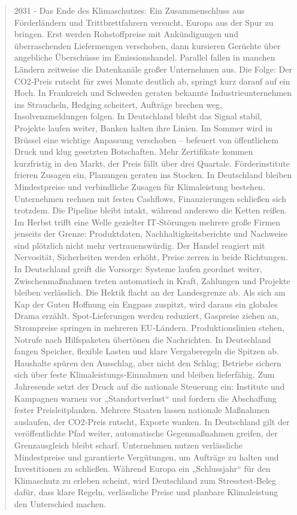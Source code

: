 \documentclass[12pt,a4paper]{scrartcl}
\begin{document}
\begin{quote}
2031 - Das Ende des Klimaschutzes: Ein Zusammenschluss aus Förderländern und Trittbrettfahrern versucht, Europa aus der Spur zu bringen. Erst werden Rohstoffpreise mit Ankündigungen und überraschenden Liefermengen verschoben, dann kursieren Gerüchte über angebliche Überschüsse im Emissionshandel. Parallel fallen in manchen Ländern zeitweise die Datenkanäle großer Unternehmen aus. Die Folge: Der CO2‑Preis rutscht für zwei Monate deutlich ab, springt kurz darauf auf ein Hoch. In Frankreich und Schweden geraten bekannte Industrieunternehmen ins Straucheln, Hedging scheitert, Aufträge brechen weg, Insolvenzmeldungen folgen. In Deutschland bleibt das Signal stabil, Projekte laufen weiter, Banken halten ihre Linien.
 Im Sommer wird in Brüssel eine wichtige Anpassung verschoben -- befeuert von öffentlichem Druck und klug gesetzten Botschaften. Mehr Zertifikate kommen kurzfristig in den Markt, der Preis fällt über drei Quartale. Förderinstitute frieren Zusagen ein, Planungen geraten ins Stocken. In Deutschland bleiben Mindestpreise und verbindliche Zusagen für Klimaleistung bestehen. Unternehmen rechnen mit festen Cashflows, Finanzierungen schließen sich trotzdem. Die Pipeline bleibt intakt, während anderswo die Ketten reißen.
 Im Herbst trifft eine Welle gezielter IT‑Störungen mehrere große Firmen jenseits der Grenze: Produktdaten, Nachhaltigkeitsberichte und Nachweise sind plötzlich nicht mehr vertrauenswürdig. Der Handel reagiert mit Nervosität, Sicherheiten werden erhöht, Preise zerren in beide Richtungen. In Deutschland greift die Vorsorge: Systeme laufen geordnet weiter, Zwischenmaßnahmen treten automatisch in Kraft, Zahlungen und Projekte bleiben verlässlich. Die Hektik flacht an der Landesgrenze ab.
 Als sich am Kap der Guten Hoffnung ein Engpass zuspitzt, wird daraus ein globales Drama erzählt. Spot‑Lieferungen werden reduziert, Gaspreise ziehen an, Strompreise springen in mehreren EU‑Ländern. Produktionslinien stehen, Notrufe nach Hilfspaketen übertönen die Nachrichten. In Deutschland fangen Speicher, flexible Lasten und klare Vergabe­regeln die Spitzen ab. Haushalte spüren den Ausschlag, aber nicht den Schlag; Betriebe sichern sich über feste Klimaleistungs‑Einnahmen und bleiben lieferfähig.
 Zum Jahresende setzt der Druck auf die nationale Steuerung ein: Institute und Kampagnen warnen vor „Standortverlust“ und fordern die Abschaffung fester Preisleitplanken. Mehrere Staaten lassen nationale Maßnahmen auslaufen, der CO2‑Preis rutscht, Exporte wanken. In Deutschland gilt der veröffentlichte Pfad weiter, automatische Gegenmaßnahmen greifen, der Grenzausgleich bleibt scharf. Unternehmen nutzen verlässliche Mindestpreise und garantierte Vergütungen, um Aufträge zu halten und Investitionen zu schließen. Während Europa ein „Schlussjahr“ für den Klimaschutz zu erleben scheint, wird Deutschland zum Stresstest‑Beleg dafür, dass klare Regeln, verlässliche Preise und planbare Klimaleistung den Unterschied machen.


\end{quote}
\end{document}
